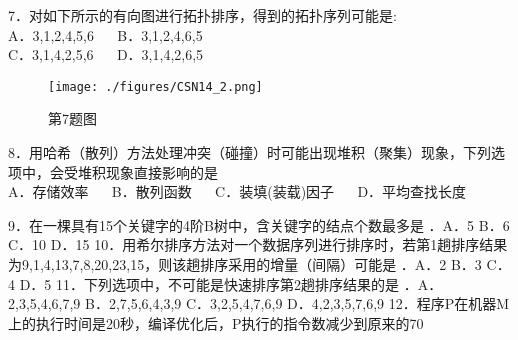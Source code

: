 7．对如下所示的有向图进行拓扑排序，得到的拓扑序列可能是: \\
A．3,1,2,4,5,6 $\quad$ B．3,1,2,4,6,5 \\
C．3,1,4,2,5,6 $\quad$ D．3,1,4,2,6,5
\begin{figure}[ht]
\centering
\texttt{[image: ./figures/CSN14\_2.png]}
\caption{第7题图} \label{CSN14_fig2}
\end{figure}

8．用哈希（散列）方法处理冲突（碰撞）时可能出现堆积（聚集）现象，下列选项中，会受堆积现象直接影响的是 \\
A．存储效率 $\quad$ B．散列函数 $\quad$ C．装填(装载)因子 $\quad$ D．平均查找长度

9．在一棵具有15个关键字的4阶B树中，含关键字的结点个数最多是 ．A．5 B．6 C．10 D．15 10．用希尔排序方法对一个数据序列进行排序时，若第1趟排序结果为9,1,4,13,7,8,20,23,15，则该趟排序采用的增量（间隔）可能是 ．A．2 B．3 C．4 D．5 11．下列选项中，不可能是快速排序第2趟排序结果的是 ．A．2,3,5,4,6,7,9 B．2,7,5,6,4,3,9 C．3,2,5,4,7,6,9 D．4,2,3,5,7,6,9 12．程序P在机器M上的执行时间是20秒，编译优化后，P执行的指令数减少到原来的70%